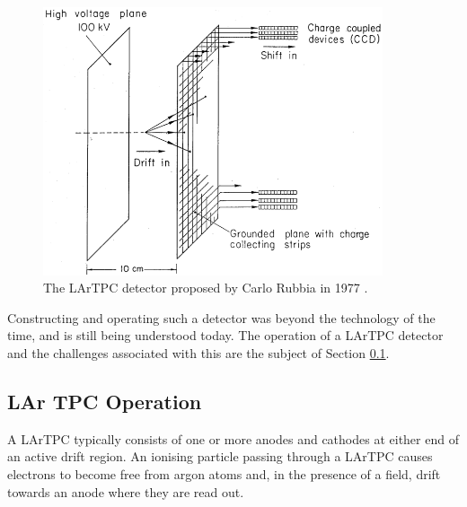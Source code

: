 \begin{figure}
  \centering
  \includegraphics[width=10cm]{RubbiaLArTPC.png}
  \caption[First LArTPC detector, Rubbia (1977)]{The LArTPC detector proposed by Carlo Rubbia in 1977 \cite{Rubbia1977}.}
  \label{fig:RubbiaLArTPC}
\end{figure}

Constructing and operating such a detector was beyond the technology of the time, and is still being understood today.  The operation of a LArTPC detector and the challenges associated with this are the subject of Section \ref{sec:LArTPCOperation}.

\subsection{LAr TPC Operation}\label{sec:LArTPCOperation}

A LArTPC typically consists of one or more anodes and cathodes at either end of an active drift region.  An ionising particle passing through a LArTPC causes electrons to become free from argon atoms and, in the presence of a field, drift towards an anode where they are read out.

